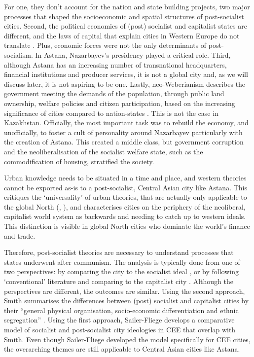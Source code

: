 \documentclass{article}
\begin{document}
For one, they don't account for the nation and state building projects, two major processes that shaped the socioeconomic and spatial structures of post-socialist cities.
Second, the political economies of (post) socialist and capitalist states are different, and the laws of capital that explain cities in Western Europe do not translate \parencite{hirt2013whatever}. Plus, economic forces were not the only determinants of post-socialism. In Astana, Nazarbayev's presidency played a critical role.
Third, although Astana has an increasing number of transnational headquarters, financial institutions and producer services, it is not a global city and, as we will discuss later, it is not aspiring to be one.
Lastly, neo-Weberianism describes the government meeting the demands of the population, through public land ownership, welfare policies and citizen participation, based on the increasing significance of cities compared to nation-states \parencite{haussermann2005european}. This is not the case in Kazakhstan.
Officially, the most important task was to rebuild the economy, and unofficially, to foster a cult of personality around Nazarbayev particularly with the creation of Astana. This created a middle class, but government corruption and the neoliberalisation of the socialist welfare state, such as the commodification of housing, stratified the society.

Urban knowledge needs to be situated in a time and place, and western theories cannot be exported as-is to a post-socialist, Central Asian city like Astana. This critiques the `universality' of urban theories, that are actually only applicable to the global North (\cite{ferenvcuhova2016accounts}, \cite{robinson2013ordinary}), and characterises cities on the periphery of the neoliberal, capitalist world system as backwards and needing to catch up to western ideals. This distinction is visible in global North cities who dominate the world's finance and trade.

Therefore, post-socialist theories are necessary to understand processes that states underwent after communism. The analysis is typically done from one of two perspectives: by comparing the city to the socialist ideal \parencite{sailer1999characteristics}, or by following `conventional' literature and comparing to the capitalist city \parencite{smith1996socialist} \parencite{haussermann1996socialist}. Although the perspectives are different, the outcomes are similar. Using the second approach, Smith summarises the differences between (post) socialist and capitalist cities by their ``general physical organisation, socio-economic differentiation and ethnic segregation'' \parencite{smith1996socialist}. Using the first approach, Sailer-Fliege develops a comparative model of socialist and post-socialist city ideologies in CEE that overlap with Smith. Even though Sailer-Fliege developed the model specifically for CEE cities, the overarching themes are still applicable to Central Asian cities like Astana.
\end{document}
